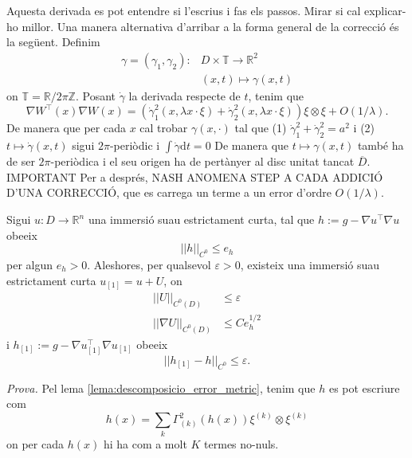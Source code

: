 \begin{obs}
    {\color{blue} Aquesta derivada es pot entendre si l'escrius i fas els passos. Mirar si cal explicar-ho millor.}
    Una manera alternativa d'arribar a la forma general de la correcció és la següent. Definim 
    \begin{equation*}
        \begin{aligned}
        \gamma = (\gamma_1, \gamma_2) : &D\times \mathbb T\to \mathbb R^2\\
        & (x,t)\mapsto \gamma(x,t)
        \end{aligned}
    \end{equation*}
    on $\mathbb T = \mathbb R / 2\pi\mathbb Z$.
    Posant $\dot\gamma$ la derivada respecte de $t$, tenim que
    \begin{equation*}
        \nabla W ^{\intercal}(x) \nabla W(x) = \left( \dot\gamma_1^2(x, \lambda x\cdot\xi) + \dot\gamma_2^2(x, \lambda x\cdot\xi) \right)\xi\otimes\xi + O(1/\lambda).
    \end{equation*}
    De manera que per cada $x$ cal trobar $\gamma(x,\cdot)$ tal que 
    (1) $\dot\gamma_1^2 + \dot\gamma_2^2 = a^2$ i 
    (2) $t\mapsto \dot\gamma(x,t)$ sigui $2\pi$-periòdic i $\int\dot\gamma\text{d}t = 0$
    De manera que $t\mapsto\gamma(x,t)$ també ha de ser $2\pi$-periòdica i el seu origen ha de pertànyer al disc unitat tancat $\overline D$.
    {\color{blue} IMPORTANT Per a després, NASH ANOMENA STEP A CADA ADDICIÓ D'UNA CORRECCIÓ, que es carrega un terme a un error d'ordre $O(1/\lambda)$. }
\end{obs}
\begin{lema}\label{Lema_iteracio}
    Sigui $u:D\to\mathbb R^n$ una immersió suau estrictament curta, tal que $h:=g-\nabla u ^{\intercal}\nabla u$ obeeix
    \begin{equation}
        ||h||_{C^0} \le e_h
    \end{equation}
    per algun $e_h > 0$. Aleshores, per qualsevol $\varepsilon > 0$, existeix una immersió suau estrictament curta $u_{[1]} = u + U$, on
    \begin{equation}
        \begin{aligned}
        ||U||_{C^0(D)} &\le \varepsilon\\
        ||\nabla U||_{C^0(D)} &\le Ce_h^{1/2}
        \end{aligned}
    \end{equation}
    i $h_{[1]}:=g-\nabla u_{[1]}^{\intercal}\nabla u_{[1]}$ obeeix
    \begin{equation}
        ||h_{[1]}-h||_{C^0} \le \varepsilon.
    \end{equation}
\end{lema}
\textit{Prova.} Pel lema \ref{lema:descomposicio_error_metric}, tenim que $h$ es pot escriure com
\begin{equation*}
    h(x) = \sum_k \Gamma^2_{(k)}(h(x))\xi^{(k)}\otimes\xi^{(k)}
\end{equation*}
on per cada $h(x)$ hi ha com a molt $K$ termes no-nuls.

